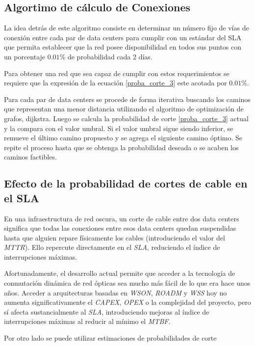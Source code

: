 \subsection{Algortimo de cálculo de Conexiones}
\label{sec:algoritmo_conex}

La idea detrás de este algoritmo consiste en determinar un número fijo de vías de conexión entre cada par de data centers para cumplir con un estándar del SLA que permita establecer que la red posee disponibilidad en todos sus puntos con un porcentaje $0.01 \%$ de probabilidad cada 2 días.

Para obtener una red que sea capaz de cumplir con estos requerimientos se requiere que la expresión de la ecuación \eqref{proba_corte_3} este acotada por $0.01\%$. 

Para cada par de data centers se procede de forma iterativa buscando los caminos que representan una menor distancia utilizando el algoritmo de optimización de grafos, dijkstra. Luego se calcula la probabilidad de corte \eqref{proba_corte_3} actual y la compara con el valor umbral. Si el valor umbral sigue siendo inferior, se remueve el último camino propuesto y se agrega el siguiente camino óptimo. Se repite el proceso hasta que se obtenga la probabilidad deseada o se acaben los caminos factibles.


\subsection{Efecto de la probabilidad de cortes de cable en el SLA}
\label{sec:cortes}

En una infraestructura de red oscura, un corte de cable entre dos data
centers significa que todas las conexiones entre esos data centers
quedan suspendidas hasta que alguien repare físicamente los cables
(introduciendo el valor del \emph{MTTR}). Ello repercute directamente
en el \emph{SLA}, reduciendo el índice de interrupciones máximas.

Afortunadamente, el desarrollo actual permite que acceder a la
tecnología de conmutación dinámica de red ópticas sea mucho más fácil
de lo que era hace unos años. Acceder a arquitecturas basadas en
\emph{WSON}, \emph{ROADM} y \emph{WSS} hoy no aumenta
significativamente el \emph{CAPEX}, \emph{OPEX} o la complejidad del
proyecto, pero sí afecta sustancialmente al \emph{SLA}, introduciendo
mejoras al índice de interrupciones máximas al reducir al mínimo el
\emph{MTBF}.

Por otro lado se puede utilizar estimaciones de probabilidades de corte

